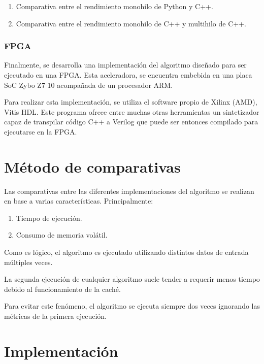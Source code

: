 \begin{enumerate}[itemsep=0.25px]
    \item Comparativa entre el rendimiento monohilo de Python y C++.
    \item Comparativa entre el rendimiento monohilo de C++ y multihilo de C++.
\end{enumerate}

\subsubsection{FPGA}

Finalmente, se desarrolla una implementación del algoritmo
diseñado para ser ejecutado en una FPGA\@.
Esta aceleradora, se encuentra embebida en una placa SoC
Zybo Z7 10 acompañada de un procesador ARM\@.

Para realizar esta implementación,
se utiliza el software propio de Xilinx (AMD),
Vitis HDL\@.
Este programa ofrece entre muchas otras herramientas
un sintetizador capaz de transpilar código C++ a Verilog
que puede ser entonces compilado
para ejecutarse en la FPGA\@.

\section{Método de comparativas}

Las comparativas entre las diferentes implementaciones
del algoritmo se realizan en base a varias características.
Principalmente:

\begin{enumerate}[itemsep=0.25px]
    \item Tiempo de ejecución.
    \item Consumo de memoria volátil.
\end{enumerate}

Como es lógico, el algoritmo es ejecutado utilizando
distintos datos de entrada múltiples veces.

\begin{notebox}
    La segunda ejecución de cualquier algoritmo suele tender a
    requerir menos tiempo debido al funcionamiento de la caché.
    
    Para evitar este fenómeno, el algoritmo se ejecuta
    siempre dos veces ignorando las métricas de la primera ejecución.
\end{notebox}

\section{Implementación}

